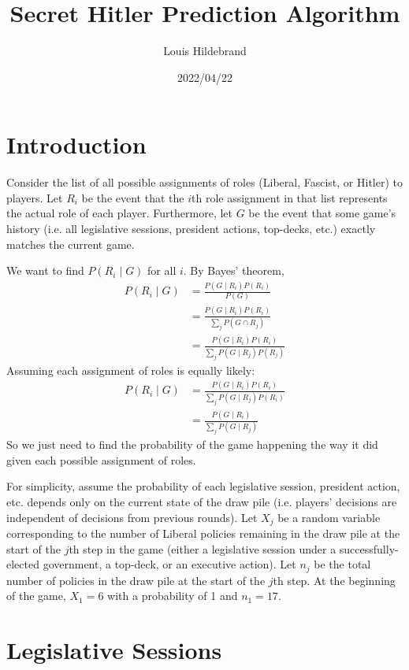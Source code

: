 \documentclass[fleqn, 12pt, letterpaper]{article}
\title{Secret Hitler Prediction Algorithm}
\author{Louis Hildebrand}
\date{2022/04/22}
\begin{document}
\maketitle

\section{Introduction}
Consider the list of all possible assignments of roles (Liberal, Fascist, or Hitler) to players. Let $R_i$ be the event that the $i$th role assignment in that list represents the actual role of each player. Furthermore, let $G$ be the event that some game's history (i.e. all legislative sessions, president actions, top-decks, etc.) exactly matches the current game.

We want to find $P(R_i \mid G)$ for all $i$. By Bayes' theorem,
\begin{align*}
	P(R_i \mid G)
		&= \frac{P(G \mid R_i) P(R_i)}{P(G)} \\
		&= \frac{P(G \mid R_i) P(R_i)}{\sum_j P(G \cap R_j)} \\
		&= \frac{P(G \mid R_i) P(R_i)}{\sum_j P(G \mid R_j) P(R_j)}
\end{align*}
Assuming each assignment of roles is equally likely:
\begin{align*}
	P(R_i \mid G)
		&= \frac{P(G \mid R_i) P(R_i)}{\sum_j P(G \mid R_j) P(R_i)} \\
		&= \frac{P(G \mid R_i)}{\sum_j P(G \mid R_j)}
\end{align*}
So we just need to find the probability of the game happening the way it did given each possible assignment of roles.

For simplicity, assume the probability of each legislative session, president action, etc. depends only on the current state of the draw pile (i.e. players' decisions are independent of decisions from previous rounds). Let $X_j$ be a random variable corresponding to the number of Liberal policies remaining in the draw pile at the start of the $j$th step in the game (either a legislative session under a successfully-elected government, a top-deck, or an executive action). Let $n_j$ be the total number of policies in the draw pile at the start of the $j$th step. At the beginning of the game, $X_1 = 6$ with a probability of 1 and $n_1 = 17$.

\section{Legislative Sessions}
\end{document}
